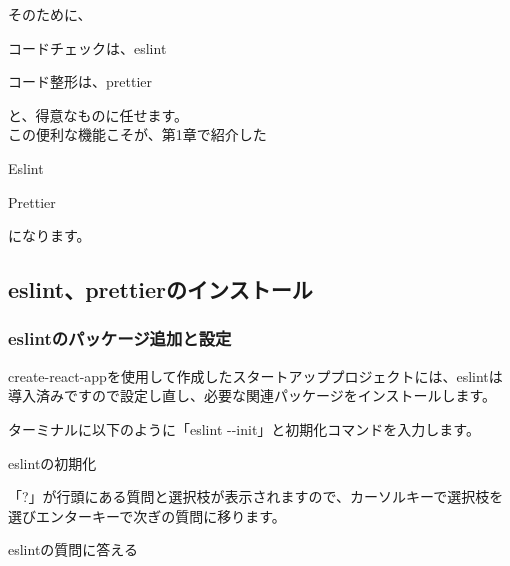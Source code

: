 そのために、\\[0pt]

\begin{starteritemize}
\item コードチェックは、eslint
\item コード整形は、prettier
\end{starteritemize}

と、得意なものに任せます。
\\[0pt]

この便利な機能こそが、第1章で紹介した\\[0pt]

\begin{starteritemize}
\item Eslint
\item Prettier
\end{starteritemize}

になります。
\\[0pt]

\subsection{eslint、prettierのインストール}
\keeplastskip{
  \label{sec:2-4-1}
  \label{sec-03eslint}
  \par\nobreak
}

\subsubsection*{eslintのパッケージ追加と設定}
\keeplastskip{
  \label{sec:2-4-1-1}
  \label{sec-03eslint-install}
  \par\nobreak
}

create{-}react{-}appを使用して作成したスタートアッププロジェクトには、eslintは導入済みですので設定し直し、必要な関連パッケージをインストールします。

ターミナルに以下のように「eslint {-}{-}init」と初期化コマンドを入力します。

\def\startercodeblockfontsize{}
\begin{starterterminal}[]{eslintの初期化}\end{starterterminal}

「?」が行頭にある質問と選択枝が表示されますので、カーソルキーで選択枝を選びエンターキーで次ぎの質問に移ります。

\def\startercodeblockfontsize{}
\begin{starterterminal}[]{eslintの質問に答える}\end{starterterminal}


